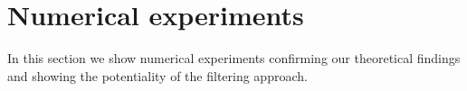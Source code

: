 \documentclass[10pt]{article}
\begin{document}
%

\section{Numerical experiments}\label{sec:NumExp}

In this section we show numerical experiments confirming our theoretical findings and showing the potentiality of the filtering approach.
\end{document}
